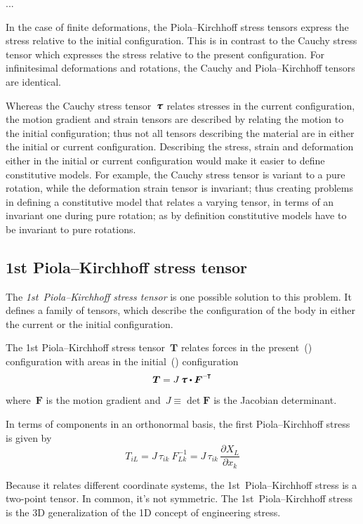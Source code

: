 ...

{\small
In the case of finite deformations, the Piola\hbox{--}Kirchhoff stress tensors express the stress relative to the initial configuration. This is in contrast to the Cauchy stress tensor which expresses the stress relative to the present configuration. For infinitesimal deformations and rotations, the Cauchy and Piola\hbox{--}Kirchhoff tensors are identical.

Whereas the Cauchy stress tensor~${\cauchystress}$ relates stresses in the current configuration, the motion gradient and strain tensors are described by relating the motion to the initial configuration; thus not all tensors describing the material are in either the initial or current configuration. Describing the stress, strain and deformation either in the initial or current configuration would make it easier to define constitutive models. For example, the Cauchy stress tensor is variant to a pure rotation, while the deformation strain tensor is invariant; thus creating problems in defining a constitutive model that relates a varying tensor, in terms of an invariant one during pure rotation; as by definition constitutive models have to be invariant to pure rotations.

\subsection*{1st Piola\hbox{--}Kirchhoff stress tensor}

The \emph{1st~Piola\hbox{--}Kirchhoff stress tensor} is one possible solution to this problem. It defines a family of tensors, which describe the configuration of the body in either the current or the initial configuration.

The 1st Piola\hbox{--}Kirchhoff stress tensor~$\bm{T}$ relates forces in the present~() configuration with areas in the initial~() configuration
\[
\bm{T} = J \, \cauchystress \dotp \bm{F}^{\expminusT}
\]
where~$\bm{F}$ is the motion gradient and~${J \equiv \operatorname{det} \bm{F}}$ is the Jacobian determinant.

In terms of components in an orthonormal basis, the first Piola\hbox{--}Kirchhoff stress is given by
\[
T_{iL} = J \, \tau_{ik}~F_{Lk}^{-1} = J \, \tau_{ik} \, \frac{\partial X_{L}}{\partial x_{k}}
\]

Because it relates different coordinate systems, the 1st~Piola\hbox{--}Kirchhoff stress is a two-point tensor. In common, it’s not symmetric. The 1st~Piola\hbox{--}Kirchhoff stress is the 3D generalization of the 1D concept of engineering stress.

}
